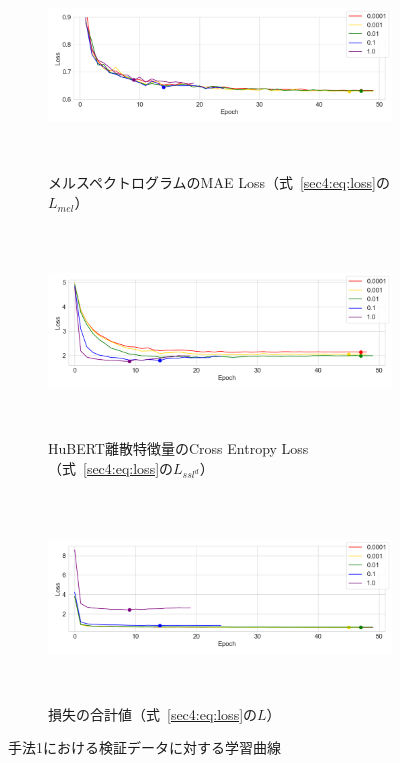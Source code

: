\documentclass[12pt]{jarticle}
\numberwithin{equation}{section}    %
\numberwithin{figure}{section}      %
\numberwithin{table}{section}      %
\begin{document}
\begin{figure}[bt]
    \centering
    \begin{subfigure}{\linewidth}
        \centering
        \includegraphics[height=55mm]{./figure/sec4/learning_curve/impact_of_loss_weights_across_methods/0/mel_loss.png}
        \caption{メルスペクトログラムのMAE Loss（式~\eqref{sec4:eq:loss}の$L_{mel}$）}
        \label{sec4:fig:learning_curve_method_1_val_mel_loss}
    \end{subfigure}
    \begin{subfigure}{\linewidth}
        \centering
        \includegraphics[height=55mm]{./figure/sec4/learning_curve/impact_of_loss_weights_across_methods/0/ssl_feature_cluster_loss.png}
        \caption{HuBERT離散特徴量のCross Entropy Loss（式~\eqref{sec4:eq:loss}の$L_{ssl^{d}}$）}
        \label{sec4:fig:learning_curve_method_1_val_ssl_feature_cluster_loss}
    \end{subfigure}
    \begin{subfigure}{\linewidth}
        \centering
        \includegraphics[height=55mm]{./figure/sec4/learning_curve/impact_of_loss_weights_across_methods/0/total_loss.png}
        \caption{損失の合計値（式~\eqref{sec4:eq:loss}の$L$）}
        \label{sec4:fig:learning_curve_method_1_val_total_loss}
    \end{subfigure}
    \caption{手法1における検証データに対する学習曲線}
    \label{sec4:fig:learning_curve_method_1_val_losses}
\end{figure}
\end{document}
